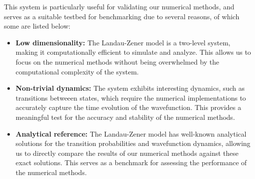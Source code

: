 \documentclass{subfiles}
\begin{document}
This system is particularly useful for validating our numerical methods, and serves as a suitable testbed for benchmarking due to several reasons, of which some are listed below:
\begin{itemize}
    \item \textbf{Low dimensionality:} The Landau-Zener model is a two-level system, making it computationally efficient to simulate and analyze. This allows us to focus on the numerical methods without being overwhelmed by the computational complexity of the system.
    \item \textbf{Non-trivial dynamics:} The system exhibits interesting dynamics, such as transitions betweeen states, which require the numerical implementations to accurately capture the time evolution of the wavefunction. This provides a meaningful test for the accuracy and stability of the numerical methods.
    \item \textbf{Analytical reference:} The Landau-Zener model has well-known analytical solutions for the transition probabilities and wavefunction dynamics, allowing us to directly compare the results of our numerical methods against these exact solutions. This serves as a benchmark for assessing the performance of the numerical methods.
\end{itemize}
\end{document}
